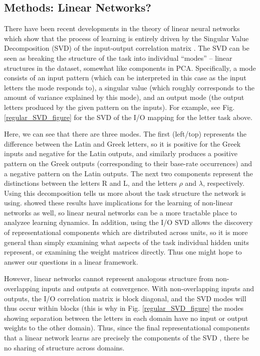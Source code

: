\documentclass[10pt,letterpaper]{article}
\begin{document}
\subsection{Methods: Linear Networks?}
There have been recent developments in the theory of linear neural networks which show that the process of learning is entirely driven by the Singular Value Decomposition (SVD) of the input-output correlation matrix \citep{Saxe2013}. The SVD can be seen as breaking the structure of the task into individual ``modes'' -- linear structures in the dataset, somewhat like components in PCA. Specifically, a mode consists of an input pattern (which can be interpreted in this case as the input letters the mode responds to), a singular value (which roughly corresponds to the amount of variance explained by this mode), and an output mode (the output letters produced by the given pattern on the inputs). For example, see Fig. \ref{regular_SVD_figure} for the SVD of the I/O mapping for the letter task above. \par
Here, we can see that there are three modes. The first (left/top) represents the difference between the Latin and Greek letters, so it is positive for the Greek inputs and negative for the Latin outputs, and similarly produces a positive pattern on the Greek outputs (corresponding to their base-rate occurrences) and a negative pattern on the Latin outputs. The next two components represent the distinctions between the letters R and L, and the letters \(\rho\) and \(\lambda\), respectively. Using this decomposition tells us more about the task structure the network is using. \citet{Saxe2013} showed these results have implications for the learning of non-linear networks as well, so linear neural networks can be a more tractable place to analyzee learning dynamics. In addition, using the I/O SVD allows the discovery of representational components which are distributed across units, so it is more general than simply examining what aspects of the task individual hidden units represent, or examining the weight matrices directly. Thus one might hope to answer our questions in a linear framework. \par
However, linear networks cannot represent analogous structure from non-overlapping inputs and outputs at convergence. With non-overlapping inputs and outputs, the I/O correlation matrix is block diagonal, and the SVD modes will thus occur within blocks (this is why in Fig. \ref{regular_SVD_figure} the modes showing separation between the letters in each domain have no input or output weights to the other domain). Thus, since the final representational components that a linear network learns are precisely the components of the SVD \citep{Saxe2013}, there be no sharing of structure across domains.\par 
\end{document}
